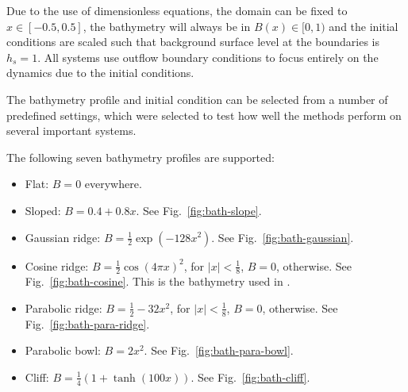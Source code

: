 Due to the use of dimensionless equations, the domain can be fixed to $x \in [-0.5, 0.5]$, the bathymetry will always be in $B(x) \in [0,1)$ and the initial conditions are scaled such that background surface level at the boundaries is $h_s = 1$. All systems use outflow boundary conditions to focus entirely on the dynamics due to the initial conditions.

The bathymetry profile and initial condition can be selected from a number of predefined settings, which were selected to test how well the methods perform on several important systems.

The following seven bathymetry profiles are supported:

\begin{itemize}
  \item Flat: $B = 0$ everywhere.
  \item Sloped: $B = 0.4 + 0.8x$. See Fig.~\ref{fig:bath-slope}.
  \item Gaussian ridge: $B = \frac{1}{2} \exp (-128 x^2)$. See Fig.~\ref{fig:bath-gaussian}.
  \item Cosine ridge: $B = \frac{1}{2} \cos(4\pi x)^2$, for $|x| < \frac{1}{8}$, $B = 0$, otherwise. See Fig.~\ref{fig:bath-cosine}. This is the bathymetry used in \cite{leveque1998balancing}.
  \item Parabolic ridge: $B = \frac{1}{2} - 32x^2$, for $|x| < \frac{1}{8}$, $B = 0$, otherwise. See Fig.~\ref{fig:bath-para-ridge}.
  \item Parabolic bowl: $B = 2 x^2$. See Fig.~\ref{fig:bath-para-bowl}.
  \item Cliff: $B = \frac{1}{4} (1 + \tanh (100 x))$. See Fig.~\ref{fig:bath-cliff}.
\end{itemize}

